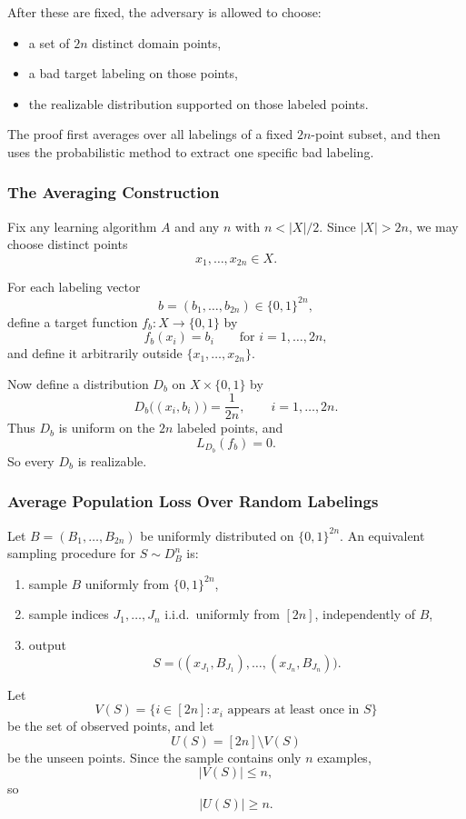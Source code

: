 \documentclass{article}
\theoremstyle{definition}
\theoremstyle{remark}
\begin{document}
After these are fixed, the adversary is allowed to choose:
\begin{itemize}
\item a set of $2n$ distinct domain points,
\item a bad target labeling on those points,
\item the realizable distribution supported on those labeled points.
\end{itemize}

The proof first averages over all labelings of a fixed $2n$-point subset, and then uses the probabilistic method to extract one specific bad labeling.

\subsubsection{The Averaging Construction}

Fix any learning algorithm $A$ and any $n$ with $n<|X|/2$. Since $|X|>2n$, we may choose distinct points
$$
x_1,\dots,x_{2n} \in X.
$$

For each labeling vector
$$
b=(b_1,\dots,b_{2n}) \in \{0,1\}^{2n},
$$
define a target function $f_b:X\to\{0,1\}$ by
$$
f_b(x_i)=b_i
\qquad \text{for } i=1,\dots,2n,
$$
and define it arbitrarily outside $\{x_1,\dots,x_{2n}\}$.

Now define a distribution $D_b$ on $X\times\{0,1\}$ by
$$
D_b\bigl((x_i,b_i)\bigr)=\frac{1}{2n},
\qquad i=1,\dots,2n.
$$
Thus $D_b$ is uniform on the $2n$ labeled points, and
$$
L_{D_b}(f_b)=0.
$$
So every $D_b$ is realizable.

\subsubsection{Average Population Loss Over Random Labelings}

Let $B=(B_1,\dots,B_{2n})$ be uniformly distributed on $\{0,1\}^{2n}$. An equivalent sampling procedure for $S\sim D_B^n$ is:
\begin{enumerate}
\item sample $B$ uniformly from $\{0,1\}^{2n}$,
\item sample indices $J_1,\dots,J_n$ i.i.d.\ uniformly from $[2n]$, independently of $B$,
\item output
$$
S=\bigl((x_{J_1},B_{J_1}),\dots,(x_{J_n},B_{J_n})\bigr).
$$
\end{enumerate}

Let
$$
V(S)=\{i\in[2n]: x_i \text{ appears at least once in } S\}
$$
be the set of observed points, and let
$$
U(S)=[2n]\setminus V(S)
$$
be the unseen points. Since the sample contains only $n$ examples,
$$
|V(S)| \le n,
$$
so
$$
|U(S)| \ge n.
$$
\end{document}
